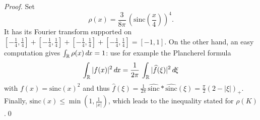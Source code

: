 \documentclass[envcountsame]{svmult}
\newcommand{\R}{\mathbb{R}}
\newcommand{\sinc}{\mathrm{sinc}}
\newcommand{\DD}[1]{\,d\hspace*{-0.3mm}{#1}}
\begin{document}
\begin{proof}
Set 
$$\rho(x) = \frac{3}{8\pi}\,\left(\sinc\left(\frac{x}{4}\right)\right)^4 .$$
It has its Fourier transform supported on $[-\frac{1}{4},\frac{1}{4}] + [-\frac{1}{4},\frac{1}{4}] + [-\frac{1}{4},\frac{1}{4}] + [-\frac{1}{4},\frac{1}{4}] = [-1,1]$. On the other hand, an easy computation gives $\int_{\R} \rho(x)\DD{x}=1$:
 use for example the Plancherel formula $$\int_{\R} |f(x)|^2\DD{x} = \frac{1}{2\pi}\,\int_{\R} |\widehat{f}(\xi)|^2\DD{\xi} $$
with $f(x)=\sinc(x)^2$ and thus $\widehat{f}(\xi) = \frac{1}{2\pi} \,\widehat{\sinc}*\widehat{\sinc}(\xi) = \frac{\pi}{2} (2-|\xi|)_+$.
Finally, $\sinc(x) \leq \min(1,\frac{1}{|x|})$, which leads to the inequality stated for $\rho(K)$.\qed
\end{proof}
\end{document}
